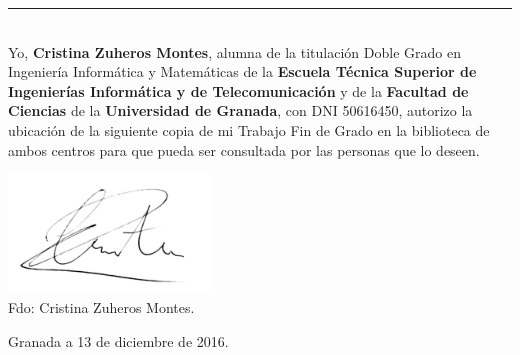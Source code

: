 \documentclass[14pt]{extarticle}
\begin{document}
\newpage
\thispagestyle{empty}

\noindent\rule[-1ex]{\textwidth}{2pt}\\[4.5ex]

Yo, \textbf{Cristina Zuheros Montes}, alumna de la titulación Doble Grado en
Ingeniería Informática y Matemáticas de la \textbf{Escuela Técnica Superior
	de Ingenierías Informática y de Telecomunicación} y de la \textbf{Facultad de Ciencias}
de la \textbf{Universidad de Granada}, con DNI 50616450, autorizo la
ubicación de la siguiente copia de mi Trabajo Fin de Grado en la biblioteca de
ambos centros para que pueda ser consultada por las personas que lo deseen.

\vspace{1cm}

\includegraphics[width=0.4\textwidth]{mifirma.jpg}\\
\noindent Fdo: Cristina Zuheros Montes.

\vspace{2cm}

\begin{flushright}
	Granada a 13 de diciembre de 2016.
\end{flushright}
\end{document}
